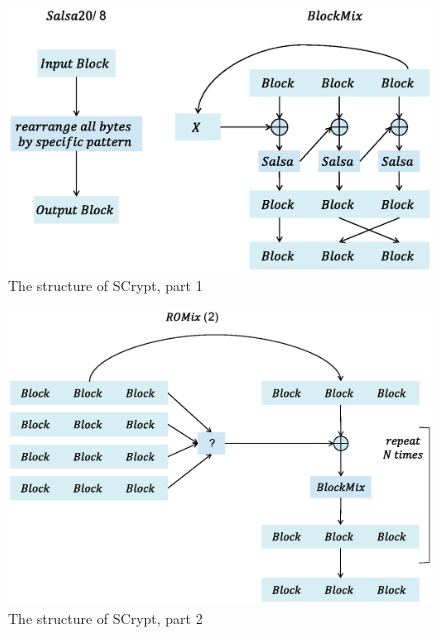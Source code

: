 \begin{figure}[ht!]
\centering
\includegraphics[width=150mm]{./images/Scrypta}
\caption{The structure of SCrypt, part 1}
\end{figure}

\begin{figure}[ht!]
\centering
\includegraphics[width=150mm]{./images/Scryptb}
\caption{The structure of SCrypt, part 2}
\end{figure}

